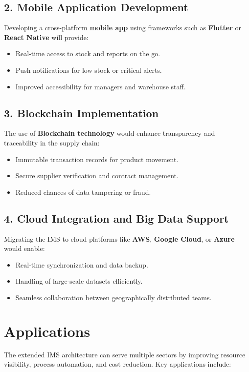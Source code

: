 \documentclass[12pt,a4paper]{article}
\begin{document}
\subsection*{2. Mobile Application Development}
Developing a cross-platform \textbf{mobile app} using frameworks such as \textbf{Flutter} or \textbf{React Native} will provide:
\begin{itemize}
    \item Real-time access to stock and reports on the go.
    \item Push notifications for low stock or critical alerts.
    \item Improved accessibility for managers and warehouse staff.
\end{itemize}

\subsection*{3. Blockchain Implementation}
The use of \textbf{Blockchain technology} would enhance transparency and traceability in the supply chain:
\begin{itemize}
    \item Immutable transaction records for product movement.
    \item Secure supplier verification and contract management.
    \item Reduced chances of data tampering or fraud.
\end{itemize}

\subsection*{4. Cloud Integration and Big Data Support}
Migrating the IMS to cloud platforms like \textbf{AWS}, \textbf{Google Cloud}, or \textbf{Azure} would enable:
\begin{itemize}
    \item Real-time synchronization and data backup.
    \item Handling of large-scale datasets efficiently.
    \item Seamless collaboration between geographically distributed teams.
\end{itemize}

\section{Applications}
The extended IMS architecture can serve multiple sectors by improving resource visibility, process automation, and cost reduction. Key applications include:
\end{document}

